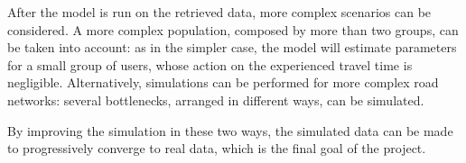 After the model is run on the retrieved data, more complex scenarios can be considered.
A more complex population, composed by more than two groups, can be taken into account:
as in the simpler case, the model will estimate parameters for a small group of users,
whose action on the experienced travel time is negligible.
Alternatively, simulations can be performed for more complex road networks:
several bottlenecks, arranged in different ways, can be simulated.

By improving the simulation in these two ways,
the simulated data can be made to progressively converge to real data,
which is the final goal of the project.



